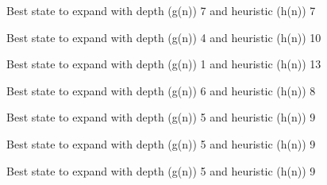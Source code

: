 \documentclass{article}
\begin{document}
{\noindent Best state to expand with depth (g(n)) 7 and heuristic (h(n)) 7\newline}
{}\newline

{\noindent Best state to expand with depth (g(n)) 4 and heuristic (h(n)) 10\newline}
{}\newline

{\noindent Best state to expand with depth (g(n)) 1 and heuristic (h(n)) 13\newline}
{}\newline

{\noindent Best state to expand with depth (g(n)) 6 and heuristic (h(n)) 8\newline}
{}\newline

{\noindent Best state to expand with depth (g(n)) 5 and heuristic (h(n)) 9\newline}
{}\newline

{\noindent Best state to expand with depth (g(n)) 5 and heuristic (h(n)) 9\newline}
{}\newline

{\noindent Best state to expand with depth (g(n)) 5 and heuristic (h(n)) 9\newline}
{}\newline
\end{document}
